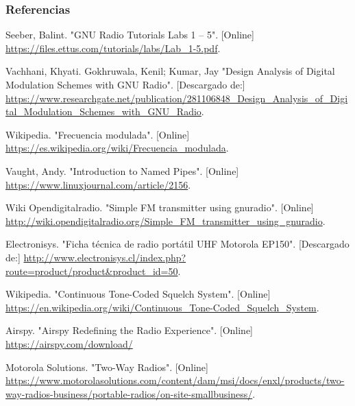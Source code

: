 \begin{frame}[allowframebreaks]
\frametitle{Referencias}



\begin{thebibliography}{11}







 Seeber, Balint.
\newblock "GNU Radio Tutorials Labs 1 – 5". [Online] \url{https://files.ettus.com/tutorials/labs/Lab\_1-5.pdf}. 

 Vachhani, Khyati. Gokhruwala, Kenil; Kumar, Jay  
\newblock "Design Analysis of Digital Modulation Schemes with GNU Radio". [Descargado de:] \url{https://www.researchgate.net/publication/281106848_Design_Analysis_of_Digital_Modulation_Schemes_with_GNU_Radio}. 

 Wikipedia.
\newblock "Frecuencia modulada". [Online] \url{https://es.wikipedia.org/wiki/Frecuencia_modulada}. 

 Vaught, Andy.
\newblock "Introduction to Named Pipes". [Online] \url{https://www.linuxjournal.com/article/2156}. 

 Wiki Opendigitalradio.
\newblock "Simple FM transmitter using gnuradio". [Online] \url{http://wiki.opendigitalradio.org/Simple_FM_transmitter_using_gnuradio}. 


 Electronisys.
\newblock "Ficha técnica de radio portátil UHF Motorola EP150". [Descargado de:] \url{http://www.electronisys.cl/index.php?route=product/product&product\_id=50}. 

 Wikipedia.
\newblock "Continuous Tone-Coded Squelch System". [Online] \url{https://en.wikipedia.org/wiki/Continuous\_Tone-Coded\_Squelch\_System}. 

 Airspy.
\newblock "Airspy Redefining the Radio Experience". [Online] \url{https://airspy.com/download/}

 Motorola Solutions.
\newblock "Two-Way Radios". [Online] \url{https://www.motorolasolutions.com/content/dam/msi/docs/enxl/products/two-way-radios-business/portable-radios/on-site-smallbusiness/}. 


\end{thebibliography}
\end{frame}
